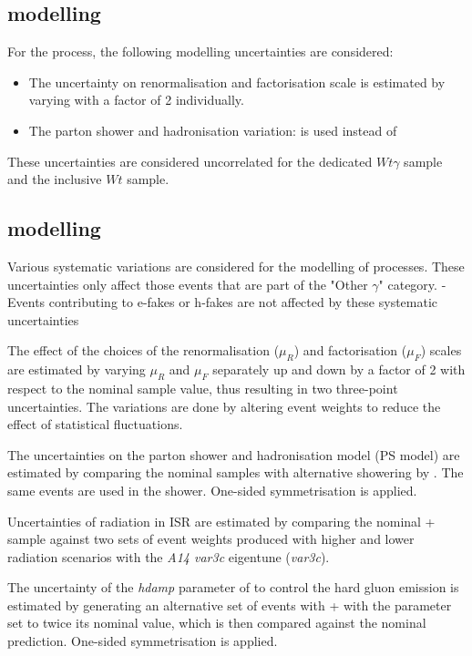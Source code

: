 \subsection{\tWy modelling}

For the \tWy process, the following modelling uncertainties are considered: 
\begin{itemize}
    \item The uncertainty on renormalisation and factorisation scale is estimated by varying with a factor of 2 individually.
%    
    \item The parton shower and hadronisation variation: \herwig{} is used instead of \pythia{} 
\end{itemize}
These uncertainties are considered uncorrelated for the dedicated $Wt\gamma$ sample and the inclusive $Wt$ sample.

\subsection{\ttbar modelling}

Various systematic variations are considered for the modelling of \ttbar processes. These uncertainties only affect those \ttbar events that are part of the "Other $\gamma$" category. \ttbar-Events contributing to e-fakes or h-fakes are not affected by these systematic uncertainties 

The effect of the choices of the renormalisation ($\mu_R$) and factorisation ($\mu_F$) scales are estimated by varying $\mu_R$ and $\mu_F$ separately up and down by a factor of 2 with respect to the nominal sample value, thus resulting in two three-point uncertainties. The variations are done by altering event weights to reduce the effect of statistical fluctuations.

The uncertainties on the parton shower and hadronisation model (\ttbar PS model) are estimated by comparing the nominal \ttbar samples with alternative showering by \herwig{}. The same \powheg events are used in the shower. One-sided symmetrisation is applied.

Uncertainties of radiation in ISR are estimated by comparing the nominal \powheg + \pythia{} sample against two sets of event weights produced with higher and lower radiation scenarios with the \pythia \emph{A14 var3c} eigentune (\ttbar \emph{var3c}). 

The uncertainty of the \emph{hdamp} parameter of \powheg to control the hard gluon emission is estimated by generating an alternative set of events with \powheg + \pythia{} with the parameter set to twice its nominal value, which is then compared against the nominal prediction. One-sided symmetrisation is applied.

